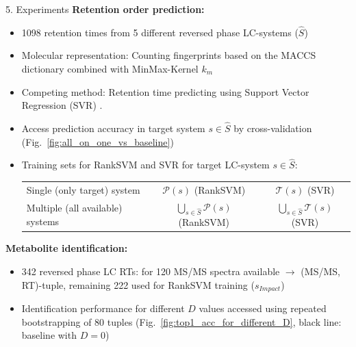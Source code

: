 \documentclass{beamer}
\newcommand{\sys}{s}
\newcommand{\kmol}{k_m} %
\newcommand{\Pref}{\mathcal{P}}
\newcommand{\RTimes}{\mathcal{T}}
\begin{document}
\begin{frame}{}
\begin{columns}[T]
\begin{column}{.52\linewidth}
\begin{block}       {{\normalsize 5. Experiments}}
                    \textbf{Retention order prediction:}
\begin{itemize}
                    \setlength\itemsep{0.25em}
                    \item 1098 retention times from 5 different reversed phase LC-systems \citep{Stanstrup2015} ($\hat{S}$)
                    \item Molecular representation: Counting fingerprints based on the MACCS dictionary \citep{Durant2002} combined with MinMax-Kernel \citep{Ralaivola2005} $\kmol$
                    \item Competing method: Retention time predicting using Support Vector Regression (SVR) \citep{Aicheler2015}.
                    \item Access prediction accuracy in target system $\sys\in\hat{S}$ by cross-validation (Fig.~\ref{fig:all_on_one_vs_baseline})
                    \item Training sets for RankSVM and SVR for target LC-system $\sys\in \hat{S}$: 
\begin{table}
                    \centering
\begin{small}
\begin{tabular}{l|c|c}
                    \toprule
                    Single (only target) system & $\Pref(\sys)$ \hfill (RankSVM) & $\RTimes(\sys)$ \hfill (SVR) \\
                    Multiple (all available) systems & $\bigcup_{\sys \in \hat{S}} \Pref(s)$ \hfill (RankSVM) & $\bigcup_{\sys \in \hat{S}} \RTimes(\sys)$ \hfill (SVR)\\
                    \bottomrule
\end{tabular}
\end{small}                    
\end{table}   
\end{itemize}
                    \textbf{Metabolite identification:}
\begin{itemize}
                    \setlength\itemsep{0.25em}
                    \item 342 reversed phase LC RTs: for 120 MS/MS spectra available $\rightarrow$ (MS/MS, RT)-tuple, remaining 222 used for RankSVM training ($\sys_{Impact}$)
                    \item Identification performance for different $D$ values accessed using repeated bootstrapping of 80 tuples (Fig.~\ref{fig:top1_acc_for_different_D}, black line: baseline with $D=0$)

\end{itemize}
\end{block}
\end{column}
\end{columns}
\end{frame}
\end{document}
